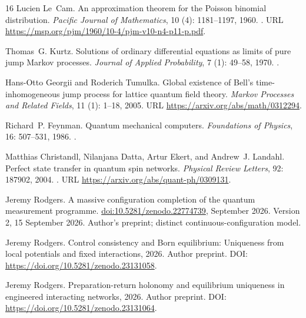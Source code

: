 \documentclass[11pt]{article}
\theoremstyle{definition}\newtheorem{definition}[theorem]{Definition}
\theoremstyle{remark}\newtheorem{remark}[theorem]{Remark}
\begin{document}
\begin{thebibliography}{16}
Lucien Le~Cam.
\newblock An approximation theorem for the {Poisson} binomial distribution.
\newblock \emph{Pacific Journal of Mathematics}, 10 (4):
  1181--1197, 1960.
\newblock {}.
\newblock URL \url{https://msp.org/pjm/1960/10-4/pjm-v10-n4-p11-p.pdf}.

Thomas~G. Kurtz.
\newblock Solutions of ordinary differential equations as limits of pure jump
  {Markov} processes.
\newblock \emph{Journal of Applied Probability}, 7 (1):
  49--58, 1970.
\newblock {}.

Hans-Otto Georgii and Roderich Tumulka.
\newblock Global existence of {Bell}'s time-inhomogeneous jump process for
  lattice quantum field theory.
\newblock \emph{Markov Processes and Related Fields}, 11 (1):
  1--18, 2005.
\newblock URL \url{https://arxiv.org/abs/math/0312294}.

Richard~P. Feynman.
\newblock Quantum mechanical computers.
\newblock \emph{Foundations of Physics}, 16: 507--531, 1986.
\newblock {}.

Matthias Christandl, Nilanjana Datta, Artur Ekert, and Andrew~J. Landahl.
\newblock Perfect state transfer in quantum spin networks.
\newblock \emph{Physical Review Letters}, 92: 187902, 2004.
\newblock {}.
\newblock URL \url{https://arxiv.org/abs/quant-ph/0309131}.

Jeremy Rodgers.
\newblock A massive configuration completion of the quantum measurement
  programme.
\newblock
  \href{https://doi.org/10.5281/zenodo.22774739}{doi:10.5281/zenodo.22774739},
  September 2026{}.
\newblock Version 2, 15 September 2026. Author's preprint; distinct
  continuous-configuration model.

Jeremy Rodgers.
\newblock Control consistency and {Born} equilibrium: Uniqueness from local
  potentials and fixed interactions, 2026{}.
\newblock Author preprint. DOI: \url{https://doi.org/10.5281/zenodo.23131058}.

Jeremy Rodgers.
\newblock Preparation-return holonomy and equilibrium uniqueness in engineered
  interacting networks, 2026{}.
\newblock Author preprint. DOI: \url{https://doi.org/10.5281/zenodo.23131064}.


\end{thebibliography}
\end{document}
